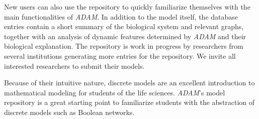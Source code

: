 \documentclass[10pt]{bmc_article}
\newenvironment{bmcformat}{\fussy\setboolean{publ}{true}}{\fussy}
\begin{document}
\begin{bmcformat}
New users can also use the repository to quickly familiarize themselves with the main functionalities of {\it ADAM}. In addition to the model itself, the database entries contain a short summary of the biological system and relevant graphs, together with an analysis of dynamic features determined by {\it ADAM} and their biological explanation. The repository is work in progress by researchers from several institutions generating more entries for the repository. We invite all interested researchers to submit their models.

Because of their intuitive nature, discrete models are an excellent introduction to mathematical modeling for students of the life sciences. {\it ADAM}'s model repository is a great starting point to familiarize students with the abstraction of discrete models such as Boolean networks.
 
%
%



\end{bmcformat}
\end{document}
